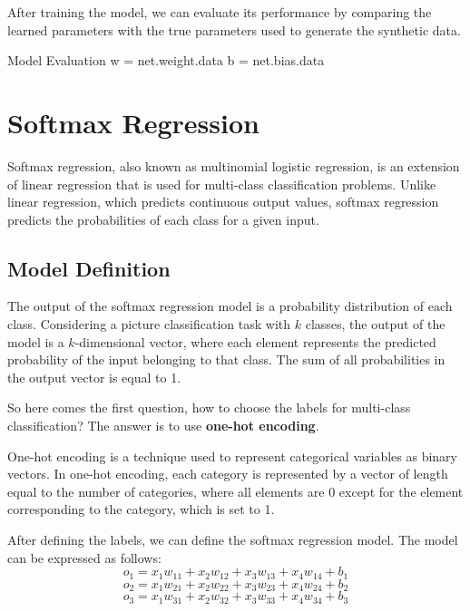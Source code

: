 After training the model, we can evaluate its performance by comparing the learned parameters with the true parameters used to generate the synthetic data.

\begin{pythoncode}{Model Evaluation}
w = net.weight.data
b = net.bias.data
\end{pythoncode}

\section{Softmax Regression}

Softmax regression, also known as multinomial logistic regression, is an extension of linear regression that is used for multi-class classification problems. Unlike linear regression, which predicts continuous output values, softmax regression predicts the probabilities of each class for a given input.

\subsection{Model Definition}

The output of the softmax regression model is a probability distribution of each class. Considering a picture classification task with \(k\) classes, the output of the model is a \(k\)-dimensional vector, where each element represents the predicted probability of the input belonging to that class. The sum of all probabilities in the output vector is equal to 1.

So here comes the first question, how to choose the labels for multi-class classification? The answer is to use \textbf{one-hot encoding}.

\begin{definition}

One-hot encoding is a technique used to represent categorical variables as binary vectors. In one-hot encoding, each category is represented by a vector of length equal to the number of categories, where all elements are 0 except for the element corresponding to the category, which is set to 1.
\end{definition}

After defining the labels, we can define the softmax regression model. The model can be expressed as follows:
\[
o_1 = x_1 w_{11} + x_2 w_{12} + x_3 w_{13} + x_4 w_{14} + b_1
\]
\[
o_2 = x_1 w_{21} + x_2 w_{22} + x_3 w_{23} + x_4 w_{24} + b_2
\]
\[
o_3 = x_1 w_{31} + x_2 w_{32} + x_3 w_{33} + x_4 w_{34} + b_3
\]

